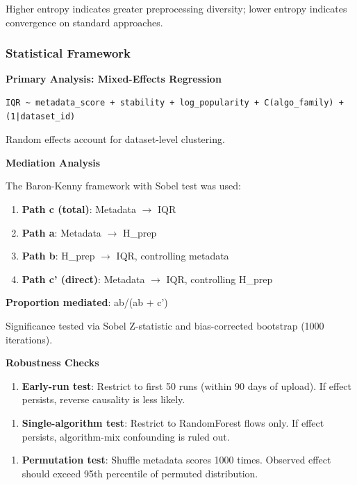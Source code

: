 Higher entropy indicates greater preprocessing diversity; lower entropy indicates convergence on standard approaches.

\subsubsection{Statistical Framework}

\textbf{Primary Analysis: Mixed-Effects Regression}

\begin{verbatim}
IQR ~ metadata_score + stability + log_popularity + C(algo_family) + (1|dataset_id)
\end{verbatim}

Random effects account for dataset-level clustering.

\textbf{Mediation Analysis}

The Baron-Kenny framework with Sobel test was used:

\begin{enumerate}
\item \textbf{Path c (total)}: Metadata $\rightarrow$ IQR
\item \textbf{Path a}: Metadata $\rightarrow$ H\_prep
\item \textbf{Path b}: H\_prep $\rightarrow$ IQR, controlling metadata
\item \textbf{Path c' (direct)}: Metadata $\rightarrow$ IQR, controlling H\_prep
\end{enumerate}

\textbf{Proportion mediated}: ab/(ab + c')

Significance tested via Sobel Z-statistic and bias-corrected bootstrap (1000 iterations).

\textbf{Robustness Checks}

\begin{enumerate}
\item \textbf{Early-run test}: Restrict to first 50 runs (within 90 days of upload). If effect persists, reverse causality is less likely.
\end{enumerate}

\begin{enumerate}
\item \textbf{Single-algorithm test}: Restrict to RandomForest flows only. If effect persists, algorithm-mix confounding is ruled out.
\end{enumerate}

\begin{enumerate}
\item \textbf{Permutation test}: Shuffle metadata scores 1000 times. Observed effect should exceed 95th percentile of permuted distribution.
\end{enumerate}

